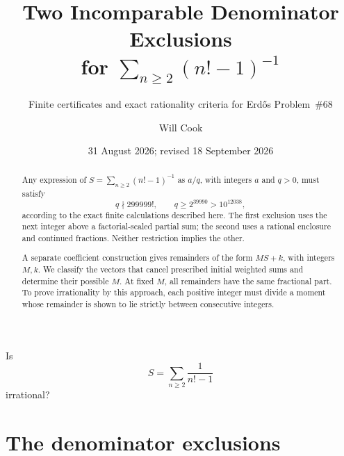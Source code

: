 \documentclass[11pt]{article}
\title{Two Incomparable Denominator Exclusions\\for $\sum_{n\ge2}(n!-1)^{-1}$}
\subtitle{Finite certificates and exact rationality criteria for Erd\H{o}s Problem~\#68}
\author{Will Cook}
\date{31 August 2026; revised 18 September 2026}
\newcommand{\Ser}{S}
\begin{document}
\maketitle
\noteprovenance

\begin{problem}[Erd\H{o}s \#68]\label{res:problem}
Is
\[
  \Ser=\sum_{n\ge2}\frac1{n!-1}
\]
irrational?
\end{problem}

\begin{abstract}
Any expression of $S=\sum_{n\ge2}(n!-1)^{-1}$ as $a/q$,
with integers $a$ and $q>0$, must satisfy
\[
q\nmid299999!,\qquad q\ge2^{39990}>10^{12038},
\]
according to the exact finite calculations described here. The first
exclusion uses the next integer above a factorial-scaled partial sum; the
second uses a rational enclosure and continued fractions. Neither
restriction implies the other.

A separate coefficient construction gives remainders of the form $MS+k$,
with integers $M,k$. We classify the vectors that cancel prescribed initial
weighted sums and determine their possible $M$. At fixed $M$, all
remainders have the same fractional part. To prove irrationality by this approach, each positive integer must
divide a moment whose remainder is shown to lie strictly between
consecutive integers.
\end{abstract}

\section{The denominator exclusions}\label{sec:problem}
\end{document}

